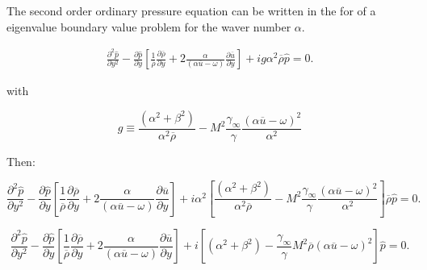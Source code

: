 The second order ordinary pressure equation  
can be written in the for of a  eigenvalue boundary value
problem for the waver number  $\alpha$. 

\begin{equation} 
\begin{split}
\frac{\partial^2 \hat{p}}{\partial y^2}
-
    \frac{\partial \hat{p}}{\partial y}
\left[
    \frac{1}{\overline{\rho}}
    \frac{\partial \overline{\rho}}{\partial y}
    +
    2
    \frac{\alpha }{\left(\alpha \overline{u}-\omega \right)}
    \frac{\partial \overline{u}}{\partial y}
\right]
+
i
g\alpha^2
\overline{\rho}
\hat{p}
=
0
.
\end{split}
\end{equation} 

with 



\begin{equation} 
g\equiv
\frac{(\alpha^2+\beta^2)}{\alpha^2\overline{\rho}}
-
M^{2}
\frac{\gamma_\infty}{\gamma}
\frac{(\alpha\overline{u}-\omega )^2}
{\alpha^2}
\end{equation} 

Then: 

\begin{equation*} 
\frac{\partial^2 \hat{p}}{\partial y^2}
-
    \frac{\partial \hat{p}}{\partial y}
\left[
    \frac{1}{\overline{\rho}}
    \frac{\partial \overline{\rho}}{\partial y}
    +
    2
    \frac{\alpha }{\left(\alpha \overline{u}-\omega \right)}
    \frac{\partial \overline{u}}{\partial y}
\right]
+
i
\alpha^2
\left[
    \frac{(\alpha^2+\beta^2)}{\alpha^2\overline{\rho}}
    -
    M^{2}
    \frac{\gamma_\infty}{\gamma}
    \frac{(\alpha\overline{u}-\omega )^2}
    {\alpha^2}
\right]
\overline{\rho}
\hat{p}
=
0
.
\end{equation*} 

\begin{equation*} 
\frac{\partial^2 \hat{p}}{\partial y^2}
-
    \frac{\partial \hat{p}}{\partial y}
\left[
    \frac{1}{\overline{\rho}}
    \frac{\partial \overline{\rho}}{\partial y}
    +
    2
    \frac{\alpha }{\left(\alpha \overline{u}-\omega \right)}
    \frac{\partial \overline{u}}{\partial y}
\right]
+
i
\left[
    (\alpha^2+\beta^2)
    -
    \frac{\gamma_\infty}{\gamma}
    M^{2}
    \overline{\rho}
    (\alpha\overline{u}-\omega )^2
\right]
\hat{p}
=
0
.
\end{equation*} 

